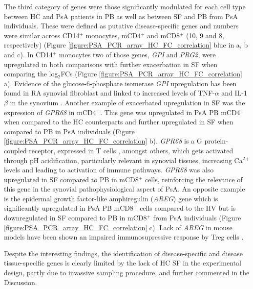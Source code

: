 The third category of genes were those significantly modulated for each cell type between HC and PsA patients in PB as well as between SF and PB from PsA individuals. These were defined as putative disease-specific genes and numbers were similar across CD14$^+$ monocytes, mCD4$^+$ and mCD8$^+$ (10, 9 and 8, respectively) (Figure \ref{figure:PSA_PCR_array_HC_FC_correlation} blue in a, b and c). In CD14$^+$ monocytes two of those genes, \textit{GPI} and \textit{PRG2}, were upregulated in both comparisons with further exacerbation in SF when comparing the log$_2$FCs (Figure \ref{figure:PSA_PCR_array_HC_FC_correlation} a). Evidence of the glucose-6-phosphate isomerase \textit{GPI} upregulation has been found in RA synovial fibroblast and linked to increased levels of TNF-$\alpha$ and IL-1$\beta$ in the synovium \parencite{Zhong2015}. %
Another example of exacerbated upregulation in SF was the expression of \textit{GPR68} in mCD4$^+$. This gene was upregulated in PsA PB mCD4$^+$ when compared to the HC counterparts and further upregulated in SF when compared to PB in PsA individuals (Figure \ref{figure:PSA_PCR_array_HC_FC_correlation} b). \textit{GPR68} is a G protein-coupled receptor, expressed in T cells , amongst others, which gets activated through pH acidification, particularly relevant in synovial tissues, increasing Ca$^2$$^+$ levels and leading to activation of immune pathways. \textit{GPR68} was also upregulated in SF compared to PB in mCD8$^+$ cells, reinforcing the relevance of this gene in the synovial pathophysiological aspect of PsA. An opposite example is the epidermal growth factor-like amphiregulin (\textit{AREG}) gene which is significantly upregulated in PsA PB mCD8$^+$ cells compared to the HV but is downregulated in SF compared to PB in mCD8$^+$ from PsA individuals (Figure \ref{figure:PSA_PCR_array_HC_FC_correlation} c). Lack of \textit{AREG} in mouse models have been shown an impaired immunosupressive response by Treg cells \parencite{Zaiss2013}. 

Despite the interesting findings, the identification of disease-specific and disease tissue-specific genes is clearly limited by the lack of HC SF in the experimental design, partly due to invassive sampling procedure, and further commented in the Discussion.

